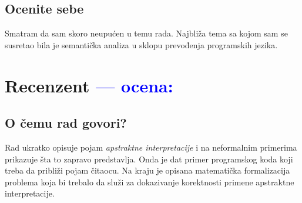 \documentclass[a4paper]{report}
\newcommand{\odgovor}[1]{\textcolor{blue}{#1}}
\begin{document}
\section{Ocenite sebe}

Smatram da sam skoro neupućen u temu rada. Najbliža tema sa kojom sam se susretao bila je semantička analiza u sklopu prevođenja programskih jezika.

\chapter{Recenzent \odgovor{--- ocena:} }


\section{O čemu rad govori?}
Rad ukratko opisuje pojam \textit{apstraktne interpretacije} i na neformalnim primerima prikazuje šta to zapravo predstavlja. Onda je dat primer programskog koda koji treba da približi pojam čitaocu. Na kraju je opisana matematička formalizacija problema koja bi trebalo da služi za dokazivanje korektnosti primene apstraktne interpretacije.
\end{document}
